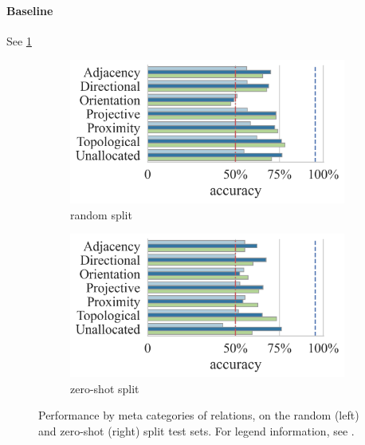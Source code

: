 \paragraph{Baseline}

See \cref{fig:performance_by_meta_cat_base}

\begin{figure}
    \centering
\begin{subfigure}[b]{0.49\linewidth}
    \centering
    \includegraphics[width=\linewidth]{images/visual-spatial-reasoning/performance_by_meta_cat_random_split_v2.png}
    \caption{random split}
\end{subfigure}
\begin{subfigure}[b]{0.49\linewidth}
    \centering
    \includegraphics[width=\linewidth]{images/visual-spatial-reasoning/performance_by_meta_cat_zeroshot_split_v2.png}
    \caption{zero-shot split}
\end{subfigure}
\caption{Performance by meta categories of relations, on the random (left) and zero-shot (right) split test sets. For legend information, see .}
    \label{fig:performance_by_meta_cat_base}
\end{figure}

